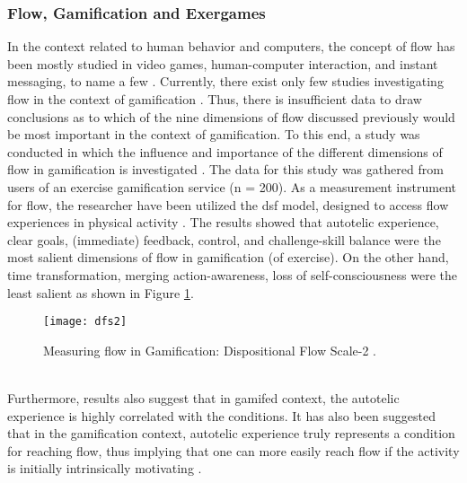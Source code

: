\subsubsection{Flow, Gamification and Exergames}
In the context related to human behavior and computers, the concept of flow has been mostly studied in video games, human-computer interaction, and instant messaging, to name a few \cite{hamari2014measuring}. Currently, there exist only few studies investigating flow in the context of gamification \cite{hamari2014measuring, sillaots2014achieving}. Thus, there is insufficient data to draw conclusions as to which of the nine dimensions of flow discussed previously would be most important in the context of gamification. To this end, a study was conducted in which the influence and importance of the different dimensions of flow in gamification is investigated \cite{hamari2014measuring}. The data for this study was gathered from users of an exercise gamification service (n = 200). As a measurement instrument for flow, the researcher have been utilized the \acrfull{dsf} model, designed to access flow experiences in physical activity \cite{jackson2002assessing}. The results showed that autotelic experience, clear goals, (immediate) feedback, control, and challenge-skill balance were the most salient dimensions of flow in gamification (of exercise). On the other hand, time transformation, merging action-awareness, loss of self-consciousness were the least salient as shown in Figure \ref{fig:dfs2}.\\
\begin{figure}[h]
    \centering
    \texttt{[image: dfs2]}
    \caption{Measuring flow in Gamification: Dispositional Flow Scale-2 \cite{dfs2}.}
    \label{fig:dfs2}
\end{figure}\\
Furthermore, results also suggest that in gamifed context, the autotelic experience is highly correlated with the conditions. It has also been suggested that in the gamification context, autotelic experience truly represents a condition for reaching flow, thus implying that one can more easily reach flow if the activity is initially intrinsically motivating \cite{hamari2014measuring}.\\\\


